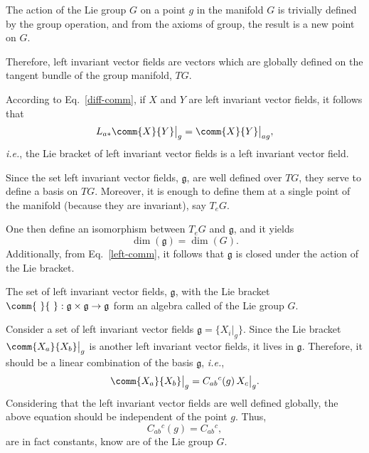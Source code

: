 \begin{infobox}
  The action of the Lie group $G$ on a point $g$ in the manifold $G$ is trivially defined by the group operation, and from the axioms of group, the result is a new point on $G$.

  Therefore, left invariant vector fields are vectors which are globally defined on the tangent bundle of the group manifold, $TG$. 
\end{infobox}

According to Eq.~\eqref{diff-comm}, if $X$ and $Y$ are left invariant vector fields, it follows that
\begin{equation}
  L_{a*} \comm{X}{Y} \bigr|_{g} = \comm{X}{Y} \bigr|_{ag},
  \label{left-comm}
\end{equation}
\emph{i.e.}, the Lie bracket of left invariant vector fields is a left invariant vector field.



Since the set left invariant vector fields, $\mathfrak{g}$, are well defined over $TG$, they serve to define a basis on $TG$. Moreover, it is enough to define them at a single point of the manifold (because they are invariant), say $T_e G$.

One then define an isomorphism between $T_e G$ and $\mathfrak{g}$, and it yields
\begin{equation*}
  \dim(\mathfrak{g}) = \dim(G).
\end{equation*}
Additionally, from Eq.~\eqref{left-comm}, it follows that $\mathfrak{g}$ is closed under the action of the Lie bracket.

\begin{Def}
  The set of left invariant vector fields, $\mathfrak{g}$, with the Lie bracket $\comm{\ }{\ }: \mathfrak{g} \times \mathfrak{g} \to \mathfrak{g}$ form an algebra called \emph{} of the Lie group $G$.
\end{Def}

Consider a set of left invariant vector fields $\mathfrak{g} = \{X_i \bigr|_g\}$. Since the Lie bracket $\comm{X_a}{X_b} \bigr|_g$  is another left invariant vector fields, it lives in $\mathfrak{g}$. Therefore, it should be a linear combination of the basis $\mathfrak{g}$, \emph{i.e.},
\begin{equation*}
  \comm{X_a}{X_b} \bigr|_g = C_{ab}{}^c(g)\, X_c \bigr|_g.
\end{equation*}
Considering that the left invariant vector fields are well defined globally, the above equation should be independent of the point $g$. Thus,
\begin{equation*}
  C_{ab}{}^c(g) = C_{ab}{}^c,
\end{equation*}
are in fact constants, know are \emph{} of the Lie group $G$.

